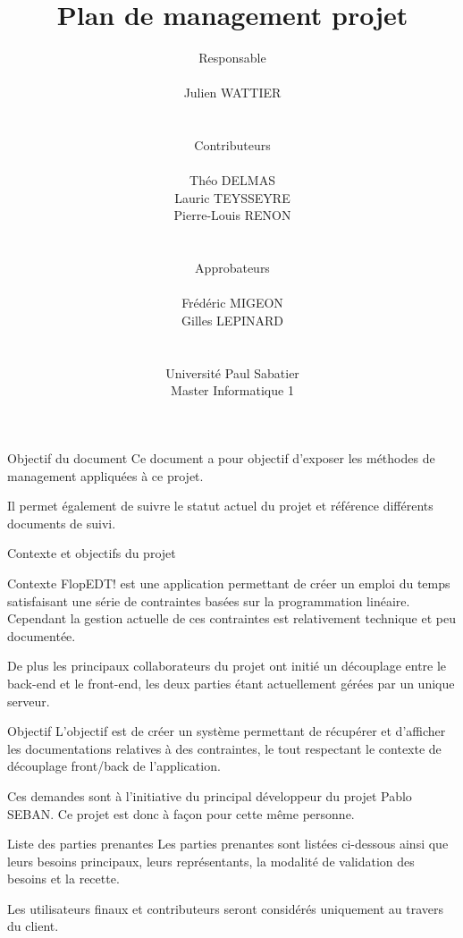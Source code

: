 \documentclass[]{article}
\title{Plan de management projet}
\author{
    Responsable\\
    \\
    Julien WATTIER\\
    \\
    \\
    Contributeurs\\
    \\
    Théo DELMAS\\
    Lauric TEYSSEYRE\\
    Pierre-Louis RENON\\
    \\
    \\
    Approbateurs\\
    \\
    Frédéric MIGEON\\
    Gilles LEPINARD\\
    \\
    \\
    Université Paul Sabatier\\
    Master Informatique 1\\
   }
\date{}
\begin{document}
\maketitle
\newpage
\tableofcontents
\newpage

{
    \setlength{\parindent}{0pt} %
    \begin{section}{\label{sec:Objectif du document}Objectif du document}
     Ce document a pour objectif d'exposer les méthodes de management appliquées à ce projet.

     Il permet également de suivre le statut actuel du projet et référence différents documents de suivi.
    \end{section}

    \begin{section}{\label{sec:Contexte et objectifs du projet}Contexte et objectifs du projet}
     \begin{subsection}{\label{sec:Context}Contexte}
         FlopEDT! est une application permettant de créer un emploi du temps satisfaisant une série de contraintes basées sur la programmation linéaire. Cependant la gestion actuelle de ces contraintes est relativement technique et peu documentée.

         De plus les principaux collaborateurs du projet ont initié un découplage entre le back-end et le front-end, les deux parties étant actuellement gérées par un unique serveur.
     \end{subsection}

     \begin{subsection}{\label{sec:Objectifs}Objectif}
         L’objectif est de créer un système permettant de récupérer et d’afficher les documentations relatives à des contraintes, le tout respectant le contexte de découplage front/back de l'application.

         Ces demandes sont à l’initiative du principal développeur du projet Pablo SEBAN. Ce projet est donc à façon pour cette même personne.
     \end{subsection}

     \begin{subsection}{\label{sec:Liste des parties prenantes}Liste des parties prenantes}
         Les parties prenantes sont listées ci-dessous ainsi que leurs besoins principaux, leurs représentants, la modalité de validation des besoins et la recette.

         Les utilisateurs finaux et contributeurs seront considérés uniquement au travers du client.


\end{subsection}
\end{section}}
\end{document}
